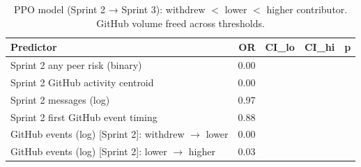 \begin{table}[ht]
\centering
\begin{tabular}{lrrrr}
  \toprule
Predictor & OR & CI_lo & CI_hi & p \\ 
  \midrule
Sprint 2 any peer risk (binary) & 0.00 &  &  &  \\ 
  Sprint 2 GitHub activity centroid & 0.00 &  &  &  \\ 
  Sprint 2 messages (log) & 0.97 &  &  &  \\ 
  Sprint 2 first GitHub event timing & 0.88 &  &  &  \\ 
  GitHub events (log) [Sprint 2]: withdrew $\to$ lower & 0.00 &  &  &  \\ 
  GitHub events (log) [Sprint 2]: lower $\to$ higher & 0.03 &  &  &  \\ 
   \bottomrule
\end{tabular}
\caption{PPO model (Sprint 2 → Sprint 3): withdrew $<$ lower $<$ higher contributor. GitHub volume freed across thresholds.} 
\label{tab:ordered_s2s3}
\end{table}
